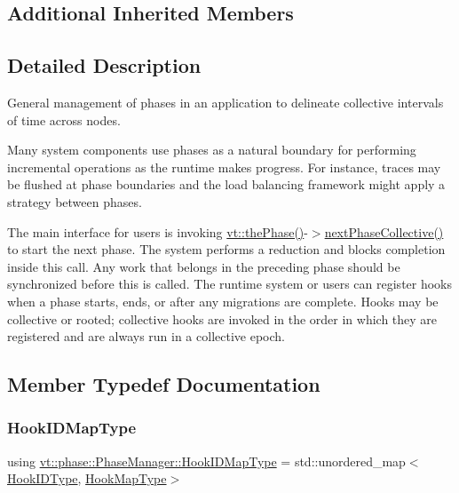 \subsection*{Additional Inherited Members}


\subsection{Detailed Description}
General management of phases in an application to delineate collective intervals of time across nodes. 

Many system components use phases as a natural boundary for performing incremental operations as the runtime makes progress. For instance, traces may be flushed at phase boundaries and the load balancing framework might apply a strategy between phases.

The main interface for users is invoking {\ttfamily \hyperlink{namespacevt_a3799d6b51fb71d7b6505760aad457e61}{vt\+::the\+Phase()}-\/$>$\hyperlink{structvt_1_1phase_1_1_phase_manager_ac94bfde4a103cbdec426542191c41092}{next\+Phase\+Collective()}} to start the next phase. The system performs a reduction and blocks completion inside this call. Any work that belongs in the preceding phase should be synchronized before this is called. The runtime system or users can register hooks when a phase starts, ends, or after any migrations are complete. Hooks may be collective or rooted; collective hooks are invoked in the order in which they are registered and are always run in a collective epoch. 

\subsection{Member Typedef Documentation}
\mbox{\label{structvt_1_1phase_1_1_phase_manager_a7f9784fa7550beaa1e7d59e639169a8b}} 
\subsubsection{\texorpdfstring{Hook\+I\+D\+Map\+Type}{HookIDMapType}}
{\footnotesize\ttfamily using \hyperlink{structvt_1_1phase_1_1_phase_manager_a7f9784fa7550beaa1e7d59e639169a8b}{vt\+::phase\+::\+Phase\+Manager\+::\+Hook\+I\+D\+Map\+Type} =  std\+::unordered\+\_\+map$<$\hyperlink{structvt_1_1phase_1_1_phase_manager_a552ed398953e67cd97c440a7f39a8a6c}{Hook\+I\+D\+Type}, \hyperlink{structvt_1_1phase_1_1_phase_manager_aa8583887716955f4bd4f438bc26141e9}{Hook\+Map\+Type}$>$}

